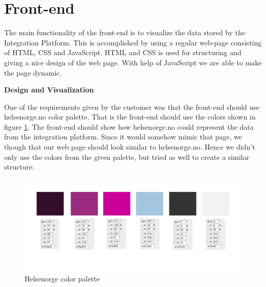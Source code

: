 \section{Front-end}
\label{subsec:front-end}

The main functionality of the front-end is to visualize the data stored by the Integration Platform.
This is accomplished by using a regular web-page consisting of HTML, CSS and JavaScript. HTML and CSS is used for structuring and giving a nice design of the web page. With help of JavaScript we are able to make the page dynamic.

\textbf{Design and Visualization}

One of the requirements given by the customer was that the front-end should use helsenorge.no color palette. 
That is the front-end should use the colors shown in figure \ref{figure:helsenorge-color-palette}. 
The front-end should show how helsenorge.no could represent the data from the integration platform. 
Since it would somehow mimic that page, we though that our web page should look similar to helsenorge.no. 
Hence we didn't only use the colors from the given palette, but tried as well to create a similar structure.

\begin{figure}[h]
\centering
\includegraphics[scale=0.30]{../Figures/helsenorge_pallett.jpg}
\caption{Helsenorge color palette}
\label{figure:helsenorge-color-palette}
\end{figure}

